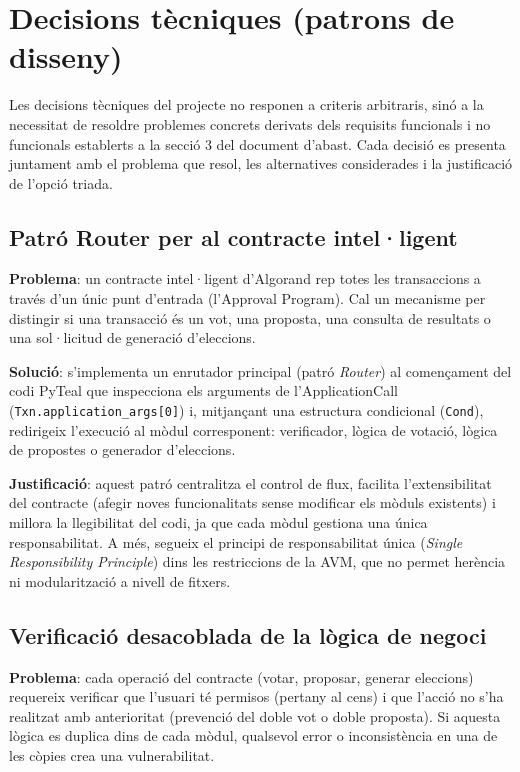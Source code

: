 \section{Decisions tècniques (patrons de disseny)}
 
Les decisions tècniques del projecte no responen a criteris arbitraris, sinó a la necessitat de resoldre problemes concrets derivats dels requisits funcionals i no funcionals establerts a la secció 3 del document d'abast. Cada decisió es presenta juntament amb el problema que resol, les alternatives considerades i la justificació de l'opció triada.
 
\subsection{Patró Router per al contracte intel·ligent}
 
\textbf{Problema}: un contracte intel·ligent d'Algorand rep totes les transaccions a través d'un únic punt d'entrada (l'Approval Program). Cal un mecanisme per distingir si una transacció és un vot, una proposta, una consulta de resultats o una sol·licitud de generació d'eleccions.
 
\textbf{Solució}: s'implementa un enrutador principal (patró \textit{Router}) al començament del codi PyTeal que inspecciona els arguments de l'ApplicationCall (\texttt{Txn.application\_args[0]}) i, mitjançant una estructura condicional (\texttt{Cond}), redirigeix l'execució al mòdul corresponent: verificador, lògica de votació, lògica de propostes o generador d'eleccions.
 
\textbf{Justificació}: aquest patró centralitza el control de flux, facilita l'extensibilitat del contracte (afegir noves funcionalitats sense modificar els mòduls existents) i millora la llegibilitat del codi, ja que cada mòdul gestiona una única responsabilitat. A més, segueix el principi de responsabilitat única (\textit{Single Responsibility Principle}) dins les restriccions de la AVM, que no permet herència ni modularització a nivell de fitxers.

\subsection{Verificació desacoblada de la lògica de negoci}

\textbf{Problema}: cada operació del contracte (votar, proposar, generar eleccions) requereix verificar que l'usuari té permisos (pertany al cens) i que l'acció no s'ha realitzat amb anterioritat (prevenció del doble vot o doble proposta). Si aquesta lògica es duplica dins de cada mòdul, qualsevol error o inconsistència en una de les còpies crea una vulnerabilitat.

